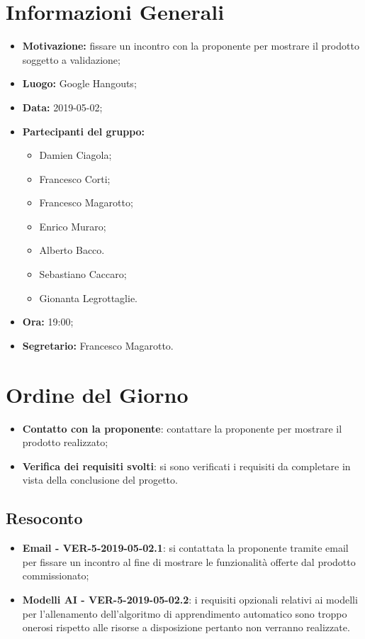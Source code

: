 \documentclass[a4paper, oneside, openany, dvipsnames, table]{article}
\begin{document}
\copertina{}


\newpage
\tableofcontents
\newpage
\section{Informazioni Generali}
\begin{itemize}
\item \textbf{Motivazione:} fissare un incontro con la proponente per mostrare il prodotto soggetto a validazione;
\item \textbf{Luogo:} Google Hangouts;
\item \textbf{Data:} 2019-05-02;
\item \textbf{Partecipanti del gruppo:} \hfill
	\begin{itemize}
		\item Damien Ciagola;
		\item Francesco Corti;
		\item Francesco Magarotto;
		\item Enrico Muraro;
		\item Alberto Bacco.
		\item Sebastiano Caccaro;
		\item Gionanta Legrottaglie.
	\end{itemize} 
\item \textbf{Ora:} 19:00;
\item \textbf{Segretario:} Francesco Magarotto.
\end{itemize}

\section{Ordine del Giorno}
\begin{itemize}
	\item \textbf{Contatto con la proponente}: contattare la proponente per mostrare il prodotto realizzato;
	\item \textbf{Verifica dei requisiti svolti}: si sono verificati i requisiti da completare in vista della conclusione del progetto.
\end{itemize}

\subsection{Resoconto}
\begin{itemize}
	\item \textbf{Email - VER-5-2019-05-02.1}: si contattata la proponente tramite email per fissare un incontro al fine di mostrare le funzionalità offerte dal prodotto commissionato;
	\item \textbf{Modelli AI - VER-5-2019-05-02.2}: i requisiti opzionali relativi ai modelli per l'allenamento dell'algoritmo di apprendimento automatico sono troppo onerosi rispetto alle risorse a disposizione pertanto non verranno realizzate.	
\end{itemize}
\end{document}
